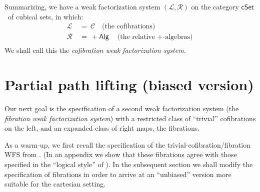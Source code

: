 \documentclass[11pt]{article}
\newcommand{\cSet}{\ensuremath{\mathsf{cSet}}}
\theoremstyle{remark}
\theoremstyle{definition}
\begin{document}
Summarizing, we have a weak factorization system $(\mathcal{L}, \mathcal{R})$ on the category \cSet\ of cubical sets, in which:
\begin{align*}
\mathcal{L}\ &=\ \mathcal{C}\quad \text{(the cofibrations)}\\
\mathcal{R}\ &=\ +\mathsf{Alg}\quad \text{(the relative $+$-algebras)}\\
\end{align*}
We shall call this the \emph{cofibration weak factorization system}.

\section{Partial path lifting (biased version)}

Our next goal is the specification of a second weak factorization system (the \emph{fibration weak factorization system}) with a restricted class of ``trivial'' cofibrations on the left, and an expanded class of right maps, the fibrations. 

As a warm-up, we first recall the specification of the trivial-cofibration/fibration WFS from \cite{GS}.  (In an appendix we show that these fibrations agree with those specified in the ``logical style'' of \cite{CCHM,OP}).  In the subsequent section we shall modify the specification of fibrations in order to arrive at an ``unbiased'' version more suitable for the cartesian setting.
\end{document}
